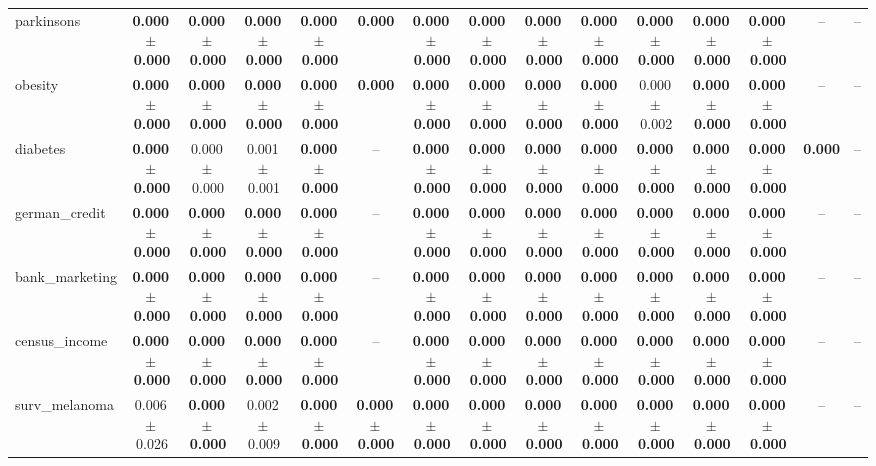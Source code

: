 \documentclass[8pt]{extarticle}
\begin{document}
\begin{longtable}{l*{14}{c}}
parkinsons & \textbf{0.000\,$\pm$\,0.000} & \textbf{0.000\,$\pm$\,0.000} & \textbf{0.000\,$\pm$\,0.000} & \textbf{0.000\,$\pm$\,0.000} & \textbf{0.000} & \textbf{0.000\,$\pm$\,0.000} & \textbf{0.000\,$\pm$\,0.000} & \textbf{0.000\,$\pm$\,0.000} & \textbf{0.000\,$\pm$\,0.000} & \textbf{0.000\,$\pm$\,0.000} & \textbf{0.000\,$\pm$\,0.000} & \textbf{0.000\,$\pm$\,0.000} & -- & -- \\
obesity & \textbf{0.000\,$\pm$\,0.000} & \textbf{0.000\,$\pm$\,0.000} & \textbf{0.000\,$\pm$\,0.000} & \textbf{0.000\,$\pm$\,0.000} & \textbf{0.000} & \textbf{0.000\,$\pm$\,0.000} & \textbf{0.000\,$\pm$\,0.000} & \textbf{0.000\,$\pm$\,0.000} & \textbf{0.000\,$\pm$\,0.000} & 0.000\,$\pm$\,0.002 & \textbf{0.000\,$\pm$\,0.000} & \textbf{0.000\,$\pm$\,0.000} & -- & -- \\
diabetes & \textbf{0.000\,$\pm$\,0.000} & 0.000\,$\pm$\,0.000 & 0.001\,$\pm$\,0.001 & \textbf{0.000\,$\pm$\,0.000} & -- & \textbf{0.000\,$\pm$\,0.000} & \textbf{0.000\,$\pm$\,0.000} & \textbf{0.000\,$\pm$\,0.000} & \textbf{0.000\,$\pm$\,0.000} & \textbf{0.000\,$\pm$\,0.000} & \textbf{0.000\,$\pm$\,0.000} & \textbf{0.000\,$\pm$\,0.000} & \textbf{0.000} & -- \\
german\_credit & \textbf{0.000\,$\pm$\,0.000} & \textbf{0.000\,$\pm$\,0.000} & \textbf{0.000\,$\pm$\,0.000} & \textbf{0.000\,$\pm$\,0.000} & -- & \textbf{0.000\,$\pm$\,0.000} & \textbf{0.000\,$\pm$\,0.000} & \textbf{0.000\,$\pm$\,0.000} & \textbf{0.000\,$\pm$\,0.000} & \textbf{0.000\,$\pm$\,0.000} & \textbf{0.000\,$\pm$\,0.000} & \textbf{0.000\,$\pm$\,0.000} & -- & -- \\
bank\_marketing & \textbf{0.000\,$\pm$\,0.000} & \textbf{0.000\,$\pm$\,0.000} & \textbf{0.000\,$\pm$\,0.000} & \textbf{0.000\,$\pm$\,0.000} & -- & \textbf{0.000\,$\pm$\,0.000} & \textbf{0.000\,$\pm$\,0.000} & \textbf{0.000\,$\pm$\,0.000} & \textbf{0.000\,$\pm$\,0.000} & \textbf{0.000\,$\pm$\,0.000} & \textbf{0.000\,$\pm$\,0.000} & \textbf{0.000\,$\pm$\,0.000} & -- & -- \\
census\_income & \textbf{0.000\,$\pm$\,0.000} & \textbf{0.000\,$\pm$\,0.000} & \textbf{0.000\,$\pm$\,0.000} & \textbf{0.000\,$\pm$\,0.000} & -- & \textbf{0.000\,$\pm$\,0.000} & \textbf{0.000\,$\pm$\,0.000} & \textbf{0.000\,$\pm$\,0.000} & \textbf{0.000\,$\pm$\,0.000} & \textbf{0.000\,$\pm$\,0.000} & \textbf{0.000\,$\pm$\,0.000} & \textbf{0.000\,$\pm$\,0.000} & -- & -- \\
surv\_melanoma & 0.006\,$\pm$\,0.026 & \textbf{0.000\,$\pm$\,0.000} & 0.002\,$\pm$\,0.009 & \textbf{0.000\,$\pm$\,0.000} & \textbf{0.000\,$\pm$\,0.000} & \textbf{0.000\,$\pm$\,0.000} & \textbf{0.000\,$\pm$\,0.000} & \textbf{0.000\,$\pm$\,0.000} & \textbf{0.000\,$\pm$\,0.000} & \textbf{0.000\,$\pm$\,0.000} & \textbf{0.000\,$\pm$\,0.000} & \textbf{0.000\,$\pm$\,0.000} & -- & -- \\

\end{longtable}
\end{document}
